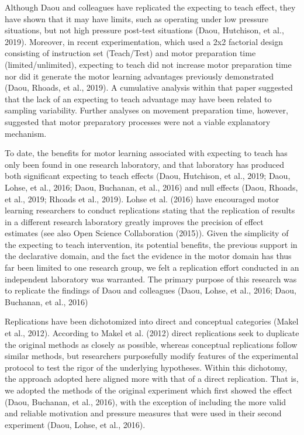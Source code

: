 \documentclass[
  english,
  man,floatsintext]{apa7}
\begin{document}
Although Daou and colleagues have replicated the expecting to teach effect, they have shown that it may have limits, such as operating under low pressure situations, but not high pressure post-test situations (Daou, Hutchison, et al., 2019). Moreover, in recent experimentation, which used a 2x2 factorial design consisting of instruction set (Teach/Test) and motor preparation time (limited/unlimited), expecting to teach did not increase motor preparation time nor did it generate the motor learning advantages previously demonstrated (Daou, Rhoads, et al., 2019). A cumulative analysis within that paper suggested that the lack of an expecting to teach advantage may have been related to sampling variability. Further analyses on movement preparation time, however, suggested that motor preparatory processes were not a viable explanatory mechanism.

To date, the benefits for motor learning associated with expecting to teach has only been found in one research laboratory, and that laboratory has produced both significant expecting to teach effects (Daou, Hutchison, et al., 2019; Daou, Lohse, et al., 2016; Daou, Buchanan, et al., 2016) and null effects (Daou, Rhoads, et al., 2019; Rhoads et al., 2019). Lohse et al. (2016) have encouraged motor learning researchers to conduct replications stating that the replication of results in a different research laboratory greatly improves the precision of effect estimates (see also Open Science Collaboration (2015)). Given the simplicity of the expecting to teach intervention, its potential benefits, the previous support in the declarative domain, and the fact the evidence in the motor domain has thus far been limited to one research group, we felt a replication effort conducted in an independent laboratory was warranted. The primary purpose of this research was to replicate the findings of Daou and colleagues (Daou, Lohse, et al., 2016; Daou, Buchanan, et al., 2016)

Replications have been dichotomized into direct and conceptual categories (Makel et al., 2012). According to Makel et al. (2012) direct replications seek to duplicate the original methods as closely as possible, whereas conceptual replications follow similar methods, but researchers purposefully modify features of the experimental protocol to test the rigor of the underlying hypotheses. Within this dichotomy, the approach adopted here aligned more with that of a direct replication. That is, we adopted the methods of the original experiment which first showed the effect (Daou, Buchanan, et al., 2016), with the exception of including the more valid and reliable motivation and pressure measures that were used in their second experiment (Daou, Lohse, et al., 2016).
\end{document}
